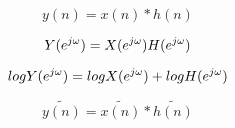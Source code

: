 
\newcommand{\indexTimeCep}{n}
\newcommand{\filtInCepFunc}{x}
\newcommand{\filtOutCepFunc}{y}
\newcommand{\filtFunc}{h}
\newcommand{\freqIndex}{e^{j\omega}}


\begin{equation*}\filtOutCepFunc(\indexTimeCep) = \filtInCepFunc(\indexTimeCep)*\filtFunc(\indexTimeCep)\end{equation*}

\begin{equation*}\MakeUppercase{\filtOutCepFunc}(\freqIndex) = \MakeUppercase{\filtInCepFunc}(\freqIndex)\MakeUppercase{\filtFunc}(\freqIndex)\end{equation*}

\begin{equation*}log\MakeUppercase{\filtOutCepFunc}(\freqIndex) = log\MakeUppercase{\filtInCepFunc}(\freqIndex)+ log\MakeUppercase{\filtFunc}(\freqIndex)\end{equation*}

\begin{equation*}\widetilde{\filtOutCepFunc(\indexTimeCep)} = \widetilde{\filtInCepFunc(\indexTimeCep)}*\widetilde{\filtFunc(\indexTimeCep)}\end{equation*}




